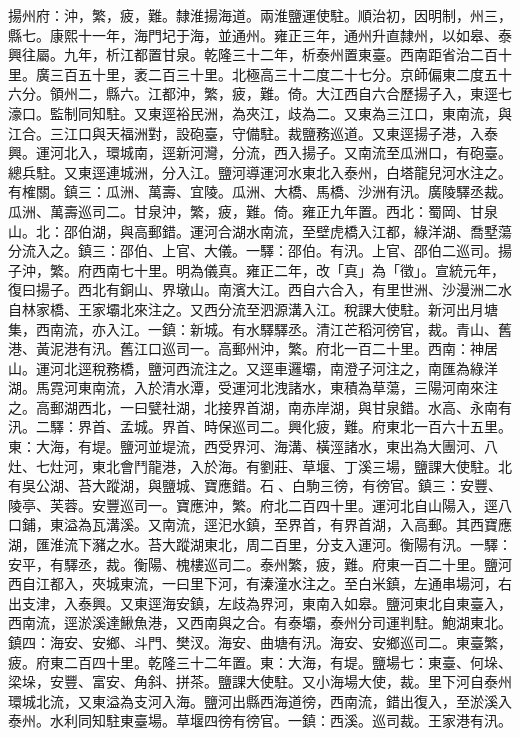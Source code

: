 \begin{pinyinscope}
揚州府：沖，繁，疲，難。隸淮揚海道。兩淮鹽運使駐。順治初，因明制，州三，縣七。康熙十一年，海門圮于海，並通州。雍正三年，通州升直隸州，以如皋、泰興往屬。九年，析江都置甘泉。乾隆三十二年，析泰州置東臺。西南距省治二百十里。廣三百五十里，袤二百三十里。北極高三十二度二十七分。京師偏東二度五十六分。領州二，縣六。江都沖，繁，疲，難。倚。大江西自六合歷揚子入，東逕七濠口。監制同知駐。又東逕裕民洲，為夾江，歧為二。又東為三江口，東南流，與江合。三江口與天福洲對，設砲臺，守備駐。裁鹽務巡道。又東逕揚子港，入泰興。運河北入，環城南，逕新河灣，分流，西入揚子。又南流至瓜洲口，有砲臺。總兵駐。又東逕連城洲，分入江。鹽河導運河水東北入泰州，白塔龍兒河水注之。有榷關。鎮三：瓜洲、萬壽、宜陵。瓜洲、大橋、馬橋、沙洲有汛。廣陵驛丞裁。瓜洲、萬壽巡司二。甘泉沖，繁，疲，難。倚。雍正九年置。西北：蜀岡、甘泉山。北：邵伯湖，與高郵錯。運河合湖水南流，至壁虎橋入江都，綠洋湖、喬墅蕩分流入之。鎮三：邵伯、上官、大儀。一驛：邵伯。有汛。上官、邵伯二巡司。揚子沖，繁。府西南七十里。明為儀真。雍正二年，改「真」為「徵」。宣統元年，復曰揚子。西北有銅山、界墩山。南濱大江。西自六合入，有里世洲、沙漫洲二水自林家橋、王家壩北來注之。又西分流至泗源溝入江。稅課大使駐。新河出月塘集，西南流，亦入江。一鎮：新城。有水驛驛丞。清江芒稻河徬官，裁。青山、舊港、黃泥港有汛。舊江口巡司一。高郵州沖，繁。府北一百二十里。西南：神居山。運河北逕稅務橋，鹽河西流注之。又逕車邏壩，南澄子河注之，南匯為綠洋湖。馬霓河東南流，入於清水潭，受運河北洩諸水，東積為草蕩，三陽河南來注之。高郵湖西北，一曰甓社湖，北接界首湖，南赤岸湖，與甘泉錯。水高、永南有汛。二驛：界首、孟城。界首、時保巡司二。興化疲，難。府東北一百六十五里。東：大海，有堤。鹽河並堤流，西受界河、海溝、橫涇諸水，東出為大團河、八灶、七灶河，東北會鬥龍港，入於海。有劉莊、草堰、丁溪三場，鹽課大使駐。北有吳公湖、苔大蹤湖，與鹽城、寶應錯。石、白駒三徬，有徬官。鎮三：安豐、陵亭、芙蓉。安豐巡司一。寶應沖，繁。府北二百四十里。運河北自山陽入，逕八口鋪，東溢為瓦溝溪。又南流，逕汜水鎮，至界首，有界首湖，入高郵。其西寶應湖，匯淮流下瀦之水。苔大蹤湖東北，周二百里，分支入運河。衡陽有汛。一驛：安平，有驛丞，裁。衡陽、槐樓巡司二。泰州繁，疲，難。府東一百二十里。鹽河西自江都入，夾城東流，一曰里下河，有溱潼水注之。至白米鎮，左通串場河，右出支津，入泰興。又東逕海安鎮，左歧為界河，東南入如皋。鹽河東北自東臺入，西南流，逕淤溪達鰍魚港，又西南與之合。有泰壩，泰州分司運判駐。鮑湖東北。鎮四：海安、安鄉、斗門、樊汊。海安、曲塘有汛。海安、安鄉巡司二。東臺繁，疲。府東二百四十里。乾隆三十二年置。東：大海，有堤。鹽場七：東臺、何垛、梁垛，安豐、富安、角斜、拼茶。鹽課大使駐。又小海場大使，裁。里下河自泰州環城北流，又東溢為支河入海。鹽河出縣西海道徬，西南流，錯出復入，至淤溪入泰州。水利同知駐東臺場。草堰四徬有徬官。一鎮：西溪。巡司裁。王家港有汛。


\end{pinyinscope}
